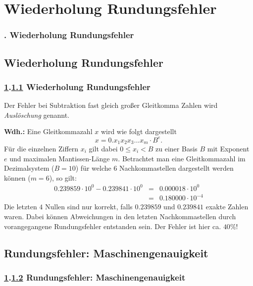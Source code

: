 \def\stitle{Wiederholung Rundungsfehler}
\section{\stitle}\label{K:wdh}
\begin{frame}
  \frametitle{\kap. \stitle}%
\tableofcontents[current]
\end{frame}
\subsection{\stitle}\label{S:rund}
\begin{frame}[t]%
 \frametitle{\ref{K:wdh}.\ref{S:rund} \stitle}

Der Fehler bei Subtraktion fast gleich gro\ss er Gleitkomma Zahlen wird \emph{Ausl\"oschung} genannt.
\medskip

\textbf{Wdh.: } Eine Gleitkommazahl $x$ wird wie folgt dargestellt
$$x = 0.x_1 x_2 x_3 ... x_m \cdot B^e.$$
F\"ur die einzelnen Ziffern $x_i$ gilt dabei $0 \leq x_i < B$ zu einer Basis $B$ mit Exponent $e$ und maximalen Mantissen-L\"ange $m$.
Betrachtet man eine Gleitkommazahl im Dezimalsystem ($B=10$) f\"ur welche $6$ Nachkommastellen dargestellt werden k\"onnen ($m=6$), so gilt:\\
\begin{eqnarray*}
0.239859 \cdot 10^0 - 0.239841 \cdot 10^0 &=& 0.000018 \cdot 10^0\\
 &=& 0.180000 \cdot 10^{-4}
\end{eqnarray*}
Die letzten $4$ Nullen sind nur korrekt, falls $0.239859$ und $0.239841$ exakte Zahlen waren.
Dabei k\"onnen Abweichungen in den letzten Nachkommastellen durch vorangegangene Rundungsfehler entstanden sein.
Der Fehler ist hier ca. $40\%$!
\end{frame}


\def\stitle{Rundungsfehler: Maschinengenauigkeit}
\subsection{\stitle}\label{S:Maschinengenauigkeit}
\begin{frame}[t]%
 \frametitle{\ref{K:wdh}.\ref{S:Maschinengenauigkeit} \stitle}



\end{frame}

